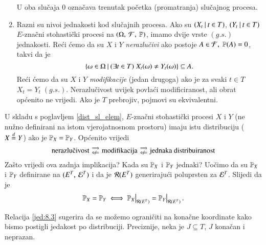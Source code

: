 \begin{nap}
\begin{enumerate}[label=(\alph*)]
\begin{itemize}
        \end{itemize}
        U oba slu\v caja $0$ ozna\v cava trenutak po\v cetka  (promatranja) slu\v cajnog procesa.
        \item Razni su nivoi jednakosti kod slu\v cajnih procesa.
        Ako su $({X_t} \: | \: {t \in T})$, $({Y_t} \: | \: {t \in T})$ $E$-zna\v cni stohasti\v cki procesi na $(\Omega, \: \mathcal{F}, \: \mathbb{P})$, imamo dvije vrste $(g.s.)$ jednakosti.
        Re\' ci \' cemo da su $X$ i $Y$ \emph{nerazlu\v civi} ako postoje $A \in \mathcal{F}, \; \mathbb{P}({A}) = 0$, takvi da je
        \begin{equation*}
            \{{\omega \in \Omega} \: | \: {(\exists t \in T) \; X_t (\omega) \neq Y_t (\omega)}\} \subseteq A.
        \end{equation*}
        Re\' ci \' cemo da su $X$ i $Y$ \emph{modifikacije} (jedan drugoga) ako je za svaki $t \in T$ $X_t = Y_t \; (g.s.)$.
        Nerazlu\v civost uvijek povla\' ci modificiranost, ali obrat op\' cenito ne vrijedi.
        Ako je $T$ prebrojiv, pojmovi su ekvivalentni.
    \end{enumerate}
\end{nap}

U skladu s poglavljem \ref{dist_sl_elem}, $E$-zna\v cni stohasti\v cki procesi $X$ i $Y$ (ne nu\v zno definirani na istom vjerojatnosnom prostoru) imaju istu distribuciju ($X \overset{d}{=} Y$) ako je $\mathbb{P}_X = \mathbb{P}_Y$.
Op\' cenito vrijedi
\begin{equation*}
    \textnormal{nerazlu\v civost}
    \begin{smallmatrix}
        \implies\\
        \notimpliedby
    \end{smallmatrix}
    \textnormal{modifikacija}
    \begin{smallmatrix}
        \implies\\
        \notimpliedby
    \end{smallmatrix}
    \textnormal{jednaka distribuiranost}
\end{equation*}
Za\v sto vrijedi ova zadnja implikacija?
Kada su $\mathbb{P}_X$ i $\mathbb{P}_Y$ jednaki?
Uo\v cimo da su $\mathbb{P}_X$ i $\mathbb{P}_Y$ definirane na $({E^T}, \: {\mathcal{E}^T})$ i da je $\mathcal{R}({E^T})$ generiraju\' ci poluprsten za $\mathcal{E}^T$.
Slijedi da je
\begin{equation}    \label{jed:8.3}
    \masP_X = \masP_Y
    \iff
    \restr{\masP_X}{\prsten{E^T}} = \restr{\masP_Y}{\prsten{E^T}}.
\end{equation}

Relacija \eqref{jed:8.3} sugerira da se mo\v zemo ograni\v citi na kona\v cne koordinate kako bismo postigli jedakost po distribuciji.
Preciznije, neka je $J \subseteq T$, $J$ kona\v can i neprazan.

